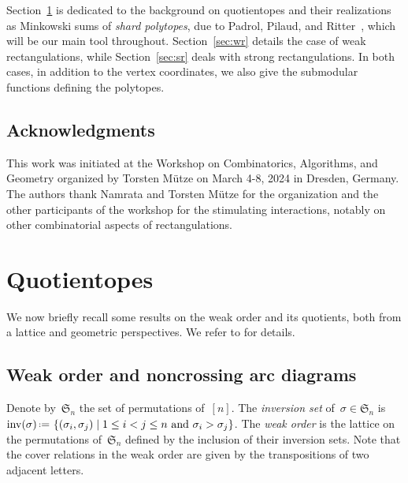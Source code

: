 \documentclass{amsart}
\theoremstyle{definition}
\newcommand{\f}[1]{\mathfrak{#1}} %
\newcommand{\set}[2]{\left\{ #1 \;\middle|\; #2 \right\}} %
\newcommand{\eqdef}{\mbox{\,\raisebox{0.2ex}{\scriptsize\ensuremath{\mathrm:}}\ensuremath{=}\,}} %
\DeclareMathOperator{\inv}{inv} %
\newcommand{\darkblue}{\color{darkblue}} %
\newcommand{\defn}[1]{\textsl{\darkblue #1}} %
\begin{document}
Section~\ref{sec:quotientopes} is dedicated to the background on quotientopes and their realizations as Minkowski sums of \defn{shard polytopes}, due to Padrol, Pilaud, and Ritter~\cite{MR4584712}, which will be our main tool throughout. Section~\ref{sec:wr} details the case of weak rectangulations, while Section~\ref{sec:sr} deals with strong rectangulations. In both cases, in addition to the vertex coordinates, we also give the submodular functions defining the polytopes.

\subsection*{Acknowledgments}

This work was initiated at the Workshop on Combinatorics, Algorithms, and Geometry organized by Torsten M\"utze on March 4-8, 2024 in Dresden, Germany.
The authors thank Namrata and Torsten M\"utze for the organization and the other participants of the workshop for the stimulating interactions, notably on other combinatorial aspects of rectangulations.


\section{Quotientopes}
\label{sec:quotientopes}

We now briefly recall some results on the weak order and its quotients, both from a lattice and geometric perspectives.
We refer to \cite{Reading-arcDiagrams, Reading-Chapters, PadrolPilaudRitter} for details.

\subsection{Weak order and noncrossing arc diagrams}

Denote by~$\f{S}_n$ the set of permutations of~$[n]$.
The \defn{inversion set} of~$\sigma \in \f{S}_n$ is~$\inv(\sigma) \eqdef \set{(\sigma_i, \sigma_j)}{1 \le i < j \le n \text{ and } \sigma_i > \sigma_j}$.
The \defn{weak order} is the lattice on the permutations of~$\f{S}_n$ defined by the inclusion of their inversion sets.
Note that the cover relations in the weak order are given by the transpositions of two adjacent letters.
\end{document}
